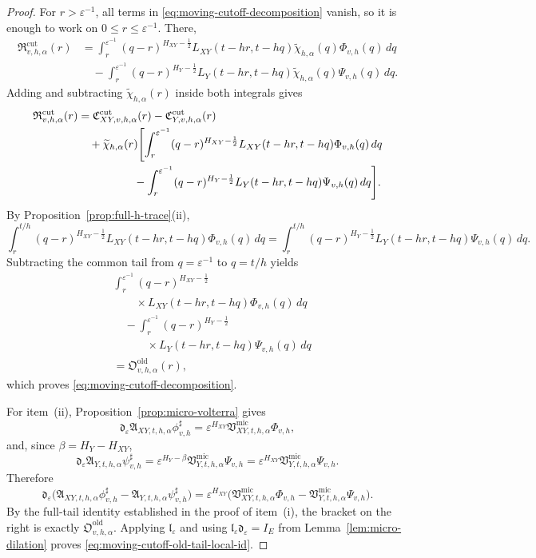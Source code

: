 \documentclass[11pt,a4paper]{amsart}
\theoremstyle{plain}
\theoremstyle{definition}
\theoremstyle{remark}
\begin{document}
\begin{proof}
For \(r>\varepsilon^{-1}\), all terms in \eqref{eq:moving-cutoff-decomposition} vanish, so it is
enough to work on \(0\le r\le \varepsilon^{-1}\). There,
\begin{align*}
\mathfrak R_{v,h,\alpha}^{\mathrm{cut}}(r)
&=
\int_r^{\varepsilon^{-1}}
(q-r)^{H_{XY}-\frac12}
L_{XY}(t-hr,t-hq)\widetilde\chi_{h,\alpha}(q)\Phi_{v,h}(q)\,dq \\
&\quad-
\int_r^{\varepsilon^{-1}}
(q-r)^{H_Y-\frac12}
L_Y(t-hr,t-hq)\widetilde\chi_{h,\alpha}(q)\Psi_{v,h}(q)\,dq.
\end{align*}
Adding and subtracting \(\widetilde\chi_{h,\alpha}(r)\) inside both integrals gives
\begin{align*}
\mathfrak R_{v,h,\alpha}^{\mathrm{cut}}(r)
&=
\mathfrak C_{XY,v,h,\alpha}^{\mathrm{cut}}(r)
-
\mathfrak C_{Y,v,h,\alpha}^{\mathrm{cut}}(r) \\
&\quad+
\widetilde\chi_{h,\alpha}(r)
\Biggl[
\int_r^{\varepsilon^{-1}}
(q-r)^{H_{XY}-\frac12}
L_{XY}(t-hr,t-hq)\Phi_{v,h}(q)\,dq \\
&\hspace{5.0em}-
\int_r^{\varepsilon^{-1}}
(q-r)^{H_Y-\frac12}
L_Y(t-hr,t-hq)\Psi_{v,h}(q)\,dq
\Biggr].
\end{align*}
By Proposition~\ref{prop:full-h-trace}(ii),
\[
\int_r^{t/h}
(q-r)^{H_{XY}-\frac12}
L_{XY}(t-hr,t-hq)\Phi_{v,h}(q)\,dq
=
\int_r^{t/h}
(q-r)^{H_Y-\frac12}
L_Y(t-hr,t-hq)\Psi_{v,h}(q)\,dq.
\]
Subtracting the common tail from \(q=\varepsilon^{-1}\) to \(q=t/h\) yields
\[
\begin{aligned}
&\int_r^{\varepsilon^{-1}}
(q-r)^{H_{XY}-\frac12}
\\
&\qquad\times
L_{XY}(t-hr,t-hq)\Phi_{v,h}(q)\,dq
\\
&\quad
-\int_r^{\varepsilon^{-1}}
(q-r)^{H_Y-\frac12}
\\
&\qquad\quad\times
L_Y(t-hr,t-hq)\Psi_{v,h}(q)\,dq
\\
&=
\mathfrak O_{v,h,\alpha}^{\mathrm{old}}(r),
\end{aligned}
\]
which proves \eqref{eq:moving-cutoff-decomposition}.

For item~(ii), Proposition~\ref{prop:micro-volterra} gives
\[
\mathfrak d_{\varepsilon}
\mathfrak A_{XY,t,h,\alpha}\phi_{v,h}^{\sharp}
=
\varepsilon^{H_{XY}}
\mathfrak V_{XY,t,h,\alpha}^{\mathrm{mic}}\Phi_{v,h},
\]
and, since \(\beta=H_Y-H_{XY}\),
\[
\mathfrak d_{\varepsilon}
\mathfrak A_{Y,t,h,\alpha}\psi_{v,h}^{\sharp}
=
\varepsilon^{H_Y-\beta}
\mathfrak V_{Y,t,h,\alpha}^{\mathrm{mic}}\Psi_{v,h}
=
\varepsilon^{H_{XY}}
\mathfrak V_{Y,t,h,\alpha}^{\mathrm{mic}}\Psi_{v,h}.
\]
Therefore
\[
\mathfrak d_{\varepsilon}
\bigl(
\mathfrak A_{XY,t,h,\alpha}\phi_{v,h}^{\sharp}
-
\mathfrak A_{Y,t,h,\alpha}\psi_{v,h}^{\sharp}
\bigr)
=
\varepsilon^{H_{XY}}
\bigl(
\mathfrak V_{XY,t,h,\alpha}^{\mathrm{mic}}\Phi_{v,h}
-
\mathfrak V_{Y,t,h,\alpha}^{\mathrm{mic}}\Psi_{v,h}
\bigr).
\]
By the full-tail identity established in the proof of item~(i), the bracket on the right is
exactly \(\mathfrak O_{v,h,\alpha}^{\mathrm{old}}\). Applying \(\mathfrak l_{\varepsilon}\) and using
\(\mathfrak l_{\varepsilon}\mathfrak d_{\varepsilon}=I_E\) from
Lemma~\ref{lem:micro-dilation} proves \eqref{eq:moving-cutoff-old-tail-local-id}.


\end{proof}
\end{document}
